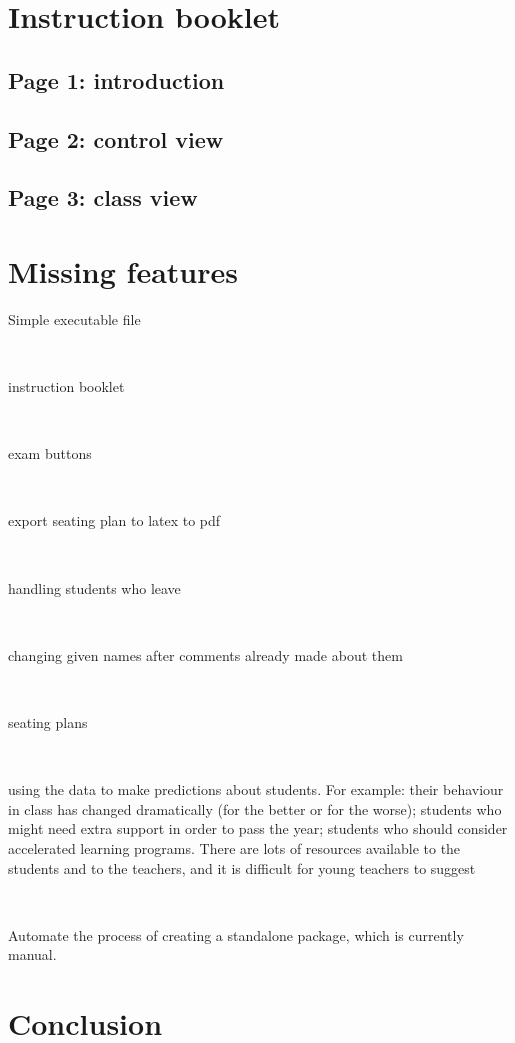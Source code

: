 \documentclass[10pt]{article}
\begin{document}
\section{Instruction booklet} \label{instructions}

\subsection{Page 1: introduction}

\subsection{Page 2: control view}

\subsection{Page 3: class view}


\section{Missing features} \label{notdone}

Simple executable file

\

instruction booklet

\

exam buttons

\

export seating plan to latex to pdf

\

handling students who leave

\

changing given names after comments already made about them

\

seating plans

\

using the data to make predictions about students. For example: their behaviour in class has changed dramatically (for the better or for the worse); students who might need extra support in order to pass the year; students who should consider accelerated learning programs. There are lots of resources available to the students and to the teachers, and it is difficult for young teachers to suggest

\

Automate the process of creating a standalone package, which is currently manual.

\section{Conclusion}
\end{document}
